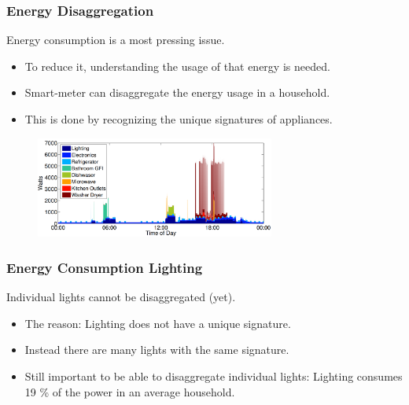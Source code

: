 \documentclass{beamer}
\begin{document}
	\begin{frame}\frametitle{Energy Disaggregation}

		Energy consumption is a most pressing issue.

		\begin{itemize}

			\item To reduce it, understanding the usage of that energy is needed.

			\item Smart-meter can disaggregate the energy usage in a household.

			\item This is done by recognizing the unique signatures of appliances.

		\end{itemize}

		\begin{figure}[t]
			\centering
			\includegraphics[width=0.7\textwidth]{../chapters/introduction-chapters/energy-consumption-house.png}
		\end{figure}


	\end{frame}




	\begin{frame}\frametitle{Energy Consumption Lighting}

		Individual lights cannot be disaggregated (yet).

		\begin{itemize}

			\item The reason: Lighting does not have a unique signature. %

			\item Instead there are many lights with the same signature.

			\item Still important to be able to disaggregate individual lights: Lighting consumes 19 \% of the power in an average household.

		\end{itemize}


	\end{frame}
\end{document}
